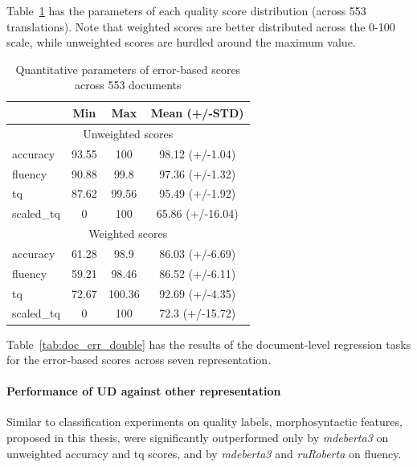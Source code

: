 Table~\ref{tab:docs_err_par} has the parameters of each quality score distribution (across 553 translations). Note that weighted scores are better distributed across the 0-100 scale, while unweighted scores are hurdled around the maximum value.
\begin{table}[H]
	\centering
	\begin{tabular}{l|ccc}
		\toprule
		& Min   & Max    & Mean (+/-STD)  \\
		\midrule
		\multicolumn{4}{c}{Unweighted scores} \\
		\midrule
		accuracy   & 93.55 & 100    & 98.12 (+/-1.04)  \\
		fluency    & 90.88 & 99.8   & 97.36 (+/-1.32)  \\
		tq         & 87.62 & 99.56  & 95.49 (+/-1.92)  \\
		scaled\_tq & 0     & 100    & 65.86 (+/-16.04) \\
		\midrule
		\multicolumn{4}{c}{Weighted scores} \\
		\midrule
		accuracy   & 61.28 & 98.9   & 86.03 (+/-6.69)  \\
		fluency    & 59.21 & 98.46  & 86.52 (+/-6.11)  \\
		tq         & 72.67 & 100.36 & 92.69 (+/-4.35)  \\
		scaled\_tq & 0     & 100    & 72.3  (+/-15.72) \\
		\bottomrule
	\end{tabular}
	\caption{\label{tab:docs_err_par}Quantitative parameters of error-based scores across 553 documents}
\end{table}

Table~\ref{tab:doc_err_double} has the results of the document-level regression tasks for the error-based scores across seven representation.
\paragraph{\label{pg:doc_err_ud_vs_all}Performance of UD against other representation}
Similar to classification experiments on quality labels, morphosyntactic features, proposed in this thesis, were significantly outperformed only by \textit{mdeberta3} on unweighted accuracy and tq scores, and by \textit{mdeberta3} and \textit{ruRoberta} on fluency.
\vspace{-1.5em}

